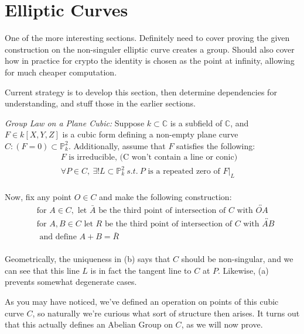 \section{Elliptic Curves}

One of the more interesting sections. Definitely need to
cover proving the given construction on the non-singuler elliptic
curve creates a group. Should also cover how in practice for crypto
the identity is chosen as the point at infinity, allowing for 
much cheaper computation.

Current strategy is to develop this section, then determine
dependencies for understanding, and stuff those in the
earlier sections.

\hrulefill

\begin{mydef}
\label{def:ellipticgroup}
\emph{Group Law on a Plane Cubic:}
Suppose $k \subset \mathbb{C}$ is a subfield of $\mathbb{C}$,
and $F \in k[X,Y,Z]$ is a cubic form defining a non-empty plane
curve $C:(F=0) \subset \mathbb{P}^2_k$. Additionally, assume that
$F$ satisfies the following:
\begin{align*}
F \text{ is irreducible, (C won't contain a line or conic)}&\tag{a}\\
\forall P \in C,~\exists! L \subset \mathbb{P}^2_k~s.t.~ P
\text{ is a repeated zero of } F|_L& \tag{b}\\
\end{align*}

Now, fix any point $O \in C$ and make the following construction:
\begin{align*}
&\text{for } A \in C, \text{ let } \bar{A} \text{ be the third point of intersection of $C$ with $\overleftrightarrow{OA}$} \tag{i}\\
&\text{for } A, B \in C \text{ let } R \text{ be the third point of intersection of $C$ with $\overleftrightarrow{AB}$}\\
&\text{ and define $A+B = \bar{R}$}\tag{ii}\\
\end{align*}
\end{mydef}

Geometrically, the uniqueness in (b) says that $C$ should be non-singular,
and we can see that this line $L$ is in fact the tangent line to $C$ at $P$.
Likewise, (a) prevents somewhat degenerate cases.

As you may have noticed, we've defined an operation on points of this
cubic curve $C$, so naturally we're curious what sort of structure then
arises. It turns out that this actually defines an Abelian Group on $C$,
as we will now prove.

